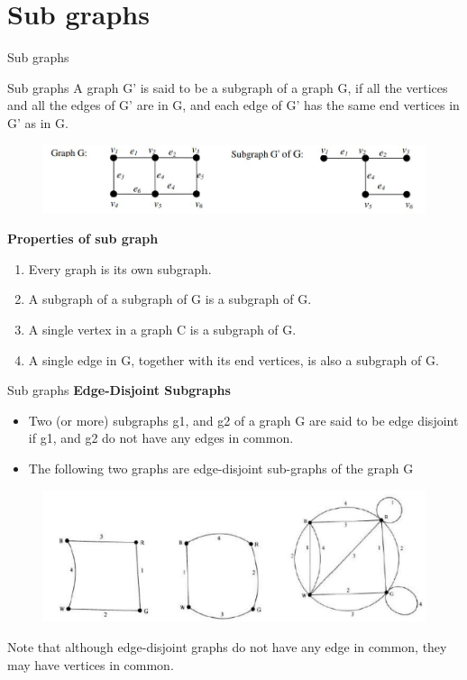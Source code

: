 \documentclass{beamer}
\begin{document}
\section{Sub graphs}
\begin{frame}{Sub graphs}
	\begin{block}{Sub graphs}
	A graph G' is said to be a subgraph of a graph G, if all the vertices and all the edges 
	of G' are in G, and each edge of G' has the same end vertices in G' as in G.
	\begin{figure}
		\includegraphics[scale=.5]{img/m23}
	\end{figure}
	\end{block}
\textbf{Properties of sub graph}
\begin{enumerate}
	\item Every graph is its own subgraph. 
	\item A subgraph of a subgraph of G is a subgraph of G. 
	\item A single vertex in a graph C is a subgraph of G. 
	\item A single edge in G, together with its end vertices, is also a subgraph of G. 
\end{enumerate}
\end{frame}
\begin{frame}{Sub graphs}
\textbf{Edge-Disjoint Subgraphs}
\begin{itemize}
	\item Two (or more) subgraphs g1, and g2 of a graph G are said
	to be edge disjoint if g1, and g2 do not have any edges in common.
	\item  The following two graphs are edge-disjoint sub-graphs of the graph G
\end{itemize}
	\begin{figure}
	\includegraphics[scale=.4]{img/m24}
\end{figure}
\begin{small}
Note that although edge-disjoint graphs do not have any edge in common, they may have 
vertices in common. \\
\end{small}
\end{frame}
\end{document}
